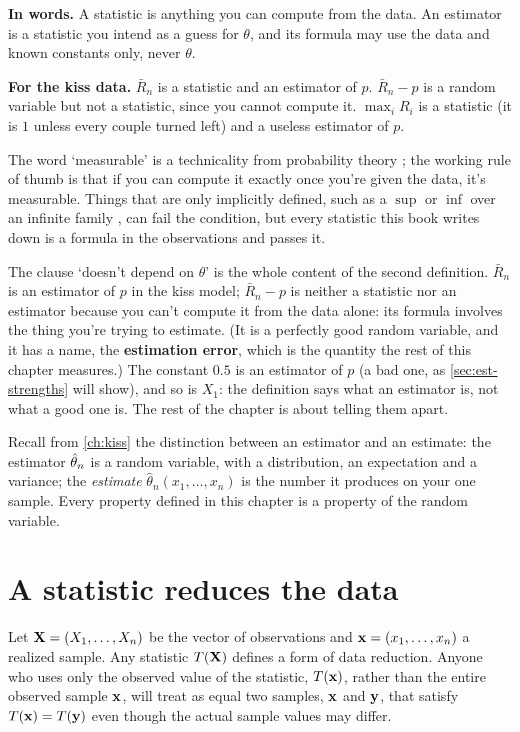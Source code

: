 \begin{inwords}
\textbf{In words.} A statistic is anything you can compute from the data. An estimator is a statistic you intend as a guess for $\theta$, and its formula may use the data and known constants only, never $\theta$.
\par\smallskip
\textbf{For the kiss data.} $\bar{R}_n$ is a statistic and an estimator of $p$. $\bar{R}_n - p$ is a random variable but not a statistic, since you cannot compute it. $\max_i R_i$ is a statistic (it is $1$ unless every couple turned left) and a useless estimator of $p$.
\end{inwords}

The word `measurable' is a technicality from probability theory ; the working rule of thumb is that if you can compute it exactly once you're given the data, it's measurable.
Things that are only implicitly defined, such as a $\sup$ or $\inf$ over an infinite family , can fail the condition, but every statistic this book writes down is a formula in the observations and passes it.

The clause `doesn't depend on $\theta$' is the whole content of the second definition.
$\bar{R}_n$ is an estimator of $p$ in the kiss model; $\bar{R}_n - p$ is neither a statistic nor an estimator because you can't compute it from the data alone: its formula involves the thing you're trying to estimate. (It is a perfectly good random variable, and it has a name, the \textbf{estimation error}, which is the quantity the rest of this chapter measures.)
The constant $0.5$ is an estimator of $p$ (a bad one, as \cref{sec:est-strengths} will show), and so is $X_1$: the definition says what an estimator is, not what a good one is.
The rest of the chapter is about telling them apart.

Recall from \cref{ch:kiss} the distinction between an estimator and an estimate: the estimator $\hat{\theta}_n$ is a random variable, with a distribution, an expectation and a variance; the \textit{estimate} $\hat{\theta}_n(x_1, \ldots, x_n)$ is the number it produces on your one sample.
Every property defined in this chapter is a property of the random variable.

\section{A statistic reduces the data}
\label{sec:est-reduction}

Let $\mathbf{X} = (X_1, \ldots, X_n)$ be the vector of observations and $\mathbf{x} = (x_1, \ldots, x_n)$ a realized sample.
Any statistic $T(\mathbf{X})$ defines a form of data reduction.
Anyone who uses only the observed value of the statistic, $T(\mathbf{x})$, rather than the entire observed sample $\mathbf{x}$, will treat as equal two samples, $\mathbf{x}$ and $\mathbf{y}$, that satisfy $T(\mathbf{x}) = T(\mathbf{y})$ even though the actual sample values may differ.

